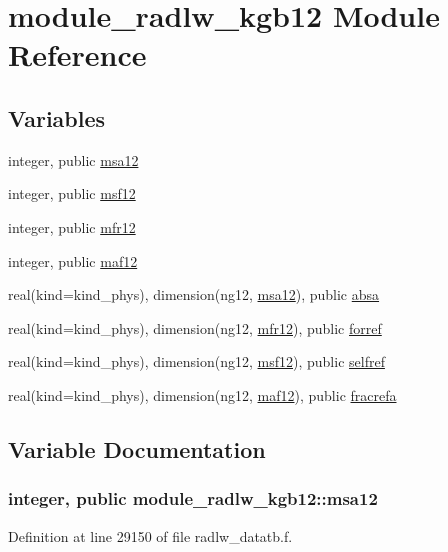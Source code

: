 \hypertarget{namespacemodule__radlw__kgb12}{}\section{module\+\_\+radlw\+\_\+kgb12 Module Reference}
\label{namespacemodule__radlw__kgb12}
\subsection*{Variables}
\begin{DoxyCompactItemize}
\item 
integer, public \hyperlink{namespacemodule__radlw__kgb12_ad1ddd94fe11b11485502d1fe6f5a1615}{msa12}
\item 
integer, public \hyperlink{group__module__radlw__main_ga3282a15ee0faaafd65509536a59e5b4f}{msf12}
\item 
integer, public \hyperlink{group__module__radlw__main_gacd751a2e48d0286e3d25a9b658a8367a}{mfr12}
\item 
integer, public \hyperlink{group__module__radlw__main_ga9d7c05182e21605108bd65f47bb5569c}{maf12}
\item 
real(kind=kind\+\_\+phys), dimension(ng12, \hyperlink{namespacemodule__radlw__kgb12_ad1ddd94fe11b11485502d1fe6f5a1615}{msa12}), public \hyperlink{group__module__radlw__main_ga7600bfa19dde3b47d8479f5766ee0c93}{absa}
\item 
real(kind=kind\+\_\+phys), dimension(ng12, \hyperlink{group__module__radlw__main_gacd751a2e48d0286e3d25a9b658a8367a}{mfr12}), public \hyperlink{group__module__radlw__main_ga97dac0d0e010441171e09e317e5aeee8}{forref}
\item 
real(kind=kind\+\_\+phys), dimension(ng12, \hyperlink{group__module__radlw__main_ga3282a15ee0faaafd65509536a59e5b4f}{msf12}), public \hyperlink{group__module__radlw__main_ga8aaf83ec7a08a244fd1e5396c9fd9b1d}{selfref}
\item 
real(kind=kind\+\_\+phys), dimension(ng12, \hyperlink{group__module__radlw__main_ga9d7c05182e21605108bd65f47bb5569c}{maf12}), public \hyperlink{group__module__radlw__main_ga58ff4f54c11eb12f7ab5157823981b16}{fracrefa}
\end{DoxyCompactItemize}


\subsection{Variable Documentation}
\subsubsection[{\texorpdfstring{msa12}{msa12}}]{\setlength{\rightskip}{0pt plus 5cm}integer, public module\+\_\+radlw\+\_\+kgb12\+::msa12}\hypertarget{namespacemodule__radlw__kgb12_ad1ddd94fe11b11485502d1fe6f5a1615}{}\label{namespacemodule__radlw__kgb12_ad1ddd94fe11b11485502d1fe6f5a1615}


Definition at line 29150 of file radlw\+\_\+datatb.\+f.

